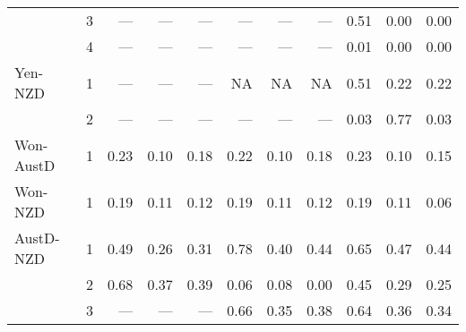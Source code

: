 \documentclass[12pt]{article}
\begin{document}
\begin{table}
\begin{threeparttable}
\begin{tabular}[c]{l c r r r | r r r | r r r}
		  & 3 & ---  & ---  & ---  & ---  & ---  & ---  & 0.51  & 0.00  & 0.00  \\
		  & 4 & ---  & ---  & ---  & ---  & ---  & ---  & 0.01  & 0.00  & 0.00  \\
\noalign{\smallskip} \noalign{\smallskip}
Yen-NZD & 1 & ---  & ---  & ---  & NA  & NA  & NA  & 0.51  & 0.22  & 0.22  \\
	    & 2 & ---  & ---  & ---  & ---  & ---  & ---  & 0.03  & 0.77  & 0.03  \\
\noalign{\smallskip}
\hline
\noalign{\smallskip} \noalign{\smallskip}
Won-AustD & 1 & 0.23  & 0.10  & 0.18  & 0.22  & 0.10  & 0.18  & 0.23  & 0.10  & 0.15  \\
\noalign{\smallskip} \noalign{\smallskip}
Won-NZD & 1 & 0.19  & 0.11  & 0.12  & 0.19  & 0.11  & 0.12  & 0.19  & 0.11  & 0.06  \\
\noalign{\smallskip}
\hline
\noalign{\smallskip} \noalign{\smallskip}
AustD-NZD & 1 & 0.49  & 0.26  & 0.31  & 0.78  & 0.40  & 0.44  & 0.65  & 0.47  & 0.44  \\
	      & 2 & 0.68  & 0.37  & 0.39  & 0.06  & 0.08  & 0.00  & 0.45  & 0.29  & 0.25  \\
	      & 3 & ---  & ---  & ---  & 0.66  & 0.35  & 0.38  & 0.64  & 0.36  & 0.34  \\
\hline \hline
	\end{tabular}
\end{threeparttable}
\end{table}

\printbibliography
\end{document}
